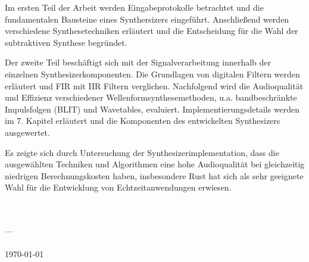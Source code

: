 Im ersten Teil der Arbeit werden Eingabeprotokolle betrachtet und die fundamentalen Bausteine eines Synthersizers eingeführt.
Anschließend werden verschiedene Synthesetechniken erläutert und die Entscheidung für die Wahl der subtraktiven Synthese begründet.

Der zweite Teil beschäftigt sich mit der Signalverarbeitung innerhalb der einzelnen Synthesizerkomponenten.
Die Grundlagen von digitalen Filtern werden erläutert und FIR mit IIR Filtern verglichen.
Nachfolgend wird die Audioqualität und Effizienz verschiedener Wellenformsynthesemethoden, u.a. bandbeschränkte Impulsfolgen (BLIT) und Wavetables, evaluiert.
Implementierungsdetails werden im 7. Kapitel erläutert und die Komponenten des entwickelten Synthesizers ausgewertet.

Es zeigte sich durch Untersuchung der Synthesizerimplementation, dass die ausgewählten Techniken und Algorithmen eine hohe Audioqualität bei gleichzeitig niedrigen Berechnungskosten haben, insbesondere Rust hat sich als sehr geeignete Wahl für die Entwicklung von Echtzeitanwendungen erwiesen.

\begin{center}
	{\sffamily
		\textbf{\documentAuthor{}}\\
		\textsc{\university{}}\\
		\universityFaculty{}---\universityDepartment{}\\
		\documentTitle{}\\
		\germanDate{}\today{}\\
		\bigskip{}
	}
\end{center}
